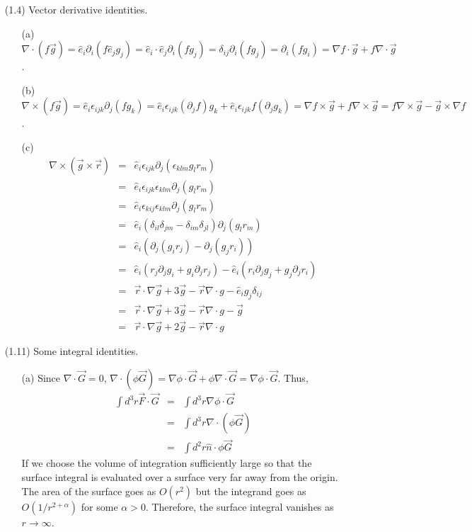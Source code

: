 \documentclass{article}
\begin{document}
\begin{enumerate}
\item[(1.4)] Vector derivative identities.
\begin{enumerate}
\item[(a)] $\nabla\cdot(f\vec{g}) = \hat{e}_i\partial_i(f\hat{e}_jg_j) =
\hat{e}_i\cdot\hat{e}_j\partial_i(fg_j) = \delta_{ij}\partial_i(fg_j) =
\partial_i(fg_i) = \nabla f \cdot\vec{g} + f\nabla\cdot\vec{g}$.

\item[(b)] $\nabla\times(f\vec{g}) = \hat{e}_i\epsilon_{ijk}\partial_j(fg_k)
= \hat{e}_i\epsilon_{ijk}(\partial_j f)g_k + \hat{e}_i\epsilon_{ijk}f
(\partial_jg_k) = \nabla f\times \vec{g} + f\nabla\times\vec{g} = 
f\nabla\times\vec{g} - \vec{g}\times\nabla f$.

\item[(c)] 
\begin{eqnarray*}
\nabla\times(\vec{g}\times\vec{r}) &=& 
    \hat{e}_i\epsilon_{ijk}\partial_j(\epsilon_{klm}g_lr_m) \\
 &=& \hat{e}_i\epsilon_{ijk}\epsilon_{klm}\partial_j(g_lr_m) \\
 &=& \hat{e}_i\epsilon_{kij}\epsilon_{klm}\partial_j(g_lr_m) \\
 &=& \hat{e}_i(\delta_{il}\delta_{jm} - \delta_{im}\delta_{jl})
     \partial_j(g_lr_m) \\
 &=& \hat{e}_i(\partial_j(g_ir_j) - \partial_j(g_jr_i)) \\
 &=& \hat{e}_i(r_j\partial_j g_i + g_i\partial_jr_j) -
     \hat{e}_i(r_i\partial_jg_j + g_j\partial_jr_i) \\
 &=& \vec{r}\cdot\nabla\vec{g} + 3\vec{g} - \vec{r}\nabla\cdot{g} 
     - \hat{e}_ig_j\delta_{ij} \\
 &=& \vec{r}\cdot\nabla\vec{g} + 3\vec{g} - \vec{r}\nabla\cdot{g} - \vec{g} \\
 &=& \vec{r}\cdot\nabla\vec{g} + 2\vec{g} - \vec{r}\nabla\cdot{g}
\end{eqnarray*}
\end{enumerate}

\item[(1.11)] Some integral identities.
\begin{enumerate}
\item[(a)] Since $\nabla\cdot\vec{G} = 0$, $\nabla\cdot(\phi\vec{G}) = 
\nabla\phi\cdot\vec{G} + \phi\nabla\cdot\vec{G} = \nabla\phi\cdot\vec{G}$. Thus,
\begin{eqnarray*}
\int d^3r \vec{F}\cdot\vec{G} &=& \int d^3r \nabla\phi\cdot\vec{G} \\
 &=& \int d^3r \nabla\cdot(\phi\vec{G})  \\
 &=& \int d^2r \hat{n}\cdot \phi\vec{G}
\end{eqnarray*}
If we choose the volume of integration sufficiently large so that the surface
integral is evaluated over a surface very far away from the origin. The area
of the surface goes as $O(r^2)$ but the integrand goes as $O(1/r^{2 + \alpha})$
for some $\alpha > 0$. Therefore, the surface integral vanishes as $r 
\rightarrow \infty$.


\end{enumerate}
\end{enumerate}
\end{document}
